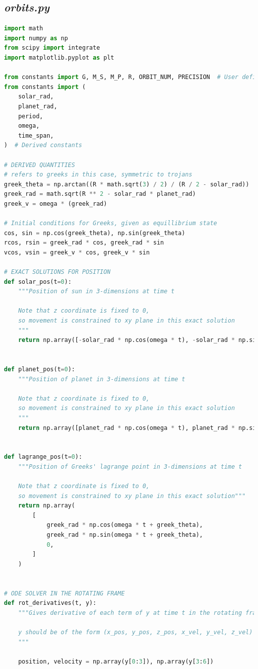 \documentclass[11pt, a4paper,twocolumn]{article} %
\begin{document}
\begin{appendices}
\bigskip
\subsection{\textit{orbits.py}}
\begin{lstlisting}[language=Python]
import math
import numpy as np
from scipy import integrate
import matplotlib.pyplot as plt

from constants import G, M_S, M_P, R, ORBIT_NUM, PRECISION  # User defined constants
from constants import (
	solar_rad,
	planet_rad,
	period,
	omega,
	time_span,
)  # Derived constants

# DERIVED QUANTITIES
# refers to greeks in this case, symmetric to trojans
greek_theta = np.arctan((R * math.sqrt(3) / 2) / (R / 2 - solar_rad))
greek_rad = math.sqrt(R ** 2 - solar_rad * planet_rad)
greek_v = omega * (greek_rad)

# Initial conditions for Greeks, given as equillibrium state 
cos, sin = np.cos(greek_theta), np.sin(greek_theta)
rcos, rsin = greek_rad * cos, greek_rad * sin
vcos, vsin = greek_v * cos, greek_v * sin

# EXACT SOLUTIONS FOR POSITION
def solar_pos(t=0):
	"""Position of sun in 3-dimensions at time t
	
	Note that z coordinate is fixed to 0, 
	so movement is constrained to xy plane in this exact solution
	"""
	return np.array([-solar_rad * np.cos(omega * t), -solar_rad * np.sin(omega * t), 0])


def planet_pos(t=0):
	"""Position of planet in 3-dimensions at time t
	
	Note that z coordinate is fixed to 0, 
	so movement is constrained to xy plane in this exact solution
	"""
	return np.array([planet_rad * np.cos(omega * t), planet_rad * np.sin(omega * t), 0])


def lagrange_pos(t=0):
	"""Position of Greeks' lagrange point in 3-dimensions at time t
	
	Note that z coordinate is fixed to 0, 
	so movement is constrained to xy plane in this exact solution"""
	return np.array(
		[
			greek_rad * np.cos(omega * t + greek_theta),
			greek_rad * np.sin(omega * t + greek_theta),
			0,
		]
	)


# ODE SOLVER IN THE ROTATING FRAME
def rot_derivatives(t, y):
	"""Gives derivative of each term of y at time t in the rotating frame
	
	y should be of the form (x_pos, y_pos, z_pos, x_vel, y_vel, z_vel)
	"""
	
	position, velocity = np.array(y[0:3]), np.array(y[3:6])
	

\end{lstlisting}
\end{appendices}
\end{document}
